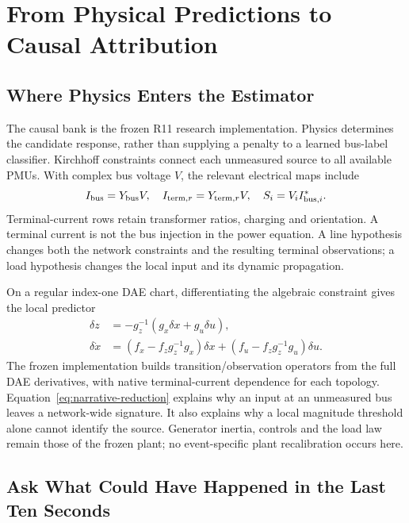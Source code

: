 \section{From Physical Predictions to Causal Attribution}
\label{sec:narrative-method}

\subsection{Where Physics Enters the Estimator}

The causal bank is the frozen R11 research implementation. Physics determines the candidate response, rather than supplying a penalty to a learned bus-label classifier. Kirchhoff constraints connect each unmeasured source to all available PMUs. With complex bus voltage $V$, the relevant electrical maps include
\begin{equation}
 I_{\rm bus}=Y_{\rm bus}V,\quad I_{{\rm term},r}=Y_{{\rm term},r}V,\quad
 S_i=V_i I_{{\rm bus},i}^{*}.
 \label{eq:narrative-electrical}
\end{equation}
Terminal-current rows retain transformer ratios, charging and orientation. A terminal current is not the bus injection in the power equation. A line hypothesis changes both the network constraints and the resulting terminal observations; a load hypothesis changes the local input and its dynamic propagation.

On a regular index-one DAE chart, differentiating the algebraic constraint gives the local predictor
\begin{align}
 \delta z&=-g_z^{-1}(g_x\delta x+g_u\delta u),\nonumber\\
 \delta\dot x&=(f_x-f_zg_z^{-1}g_x)\delta x
 +(f_u-f_zg_z^{-1}g_u)\delta u.
 \label{eq:narrative-reduction}
\end{align}
The frozen implementation builds transition/observation operators from the full DAE derivatives, with native terminal-current dependence for each topology. Equation~\eqref{eq:narrative-reduction} explains why an input at an unmeasured bus leaves a network-wide signature. It also explains why a local magnitude threshold alone cannot identify the source. Generator inertia, controls and the load law remain those of the frozen plant; no event-specific plant recalibration occurs here.

\subsection{Ask What Could Have Happened in the Last Ten Seconds}

